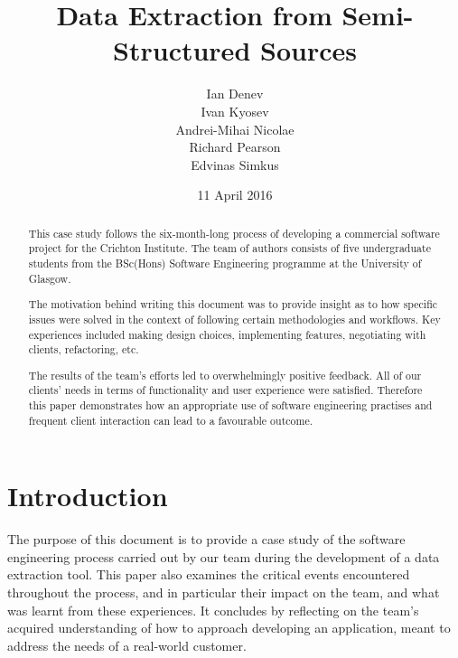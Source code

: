 \documentclass{l3proj}
\begin{document}
\title{Data Extraction from Semi-Structured Sources}

\author{Ian Denev \\
        Ivan Kyosev \\
        Andrei-Mihai Nicolae \\
        Richard Pearson \\
        Edvinas Simkus
}

\date{11 April 2016}

\maketitle

\begin{abstract}

This case study follows the six-month-long process of developing a commercial software project for the Crichton Institute. The team of authors consists of five undergraduate students from the BSc(Hons) Software Engineering programme at the University of Glasgow. 

The motivation behind writing this document was to provide insight as to how specific issues were solved in the context of following certain methodologies and workflows. Key experiences included making design choices, implementing features, negotiating with clients, refactoring, etc. 

The results of the team's efforts led to overwhelmingly positive feedback. All of our clients' needs in terms of functionality and user experience were satisfied. Therefore this paper demonstrates how an appropriate use of software engineering practises and frequent client interaction can lead to a favourable outcome.

\end{abstract}

\educationalconsent

\newpage

\section{Introduction}

The purpose of this document is to provide a case study of the software engineering process carried out by our team during the development of a data extraction tool. This paper also examines the critical events encountered throughout the process, and in particular their impact on the team, and what was learnt from these experiences. It concludes by reflecting on the team's acquired understanding of how to approach developing an application, meant to address the needs of a real-world customer.
\end{document}
